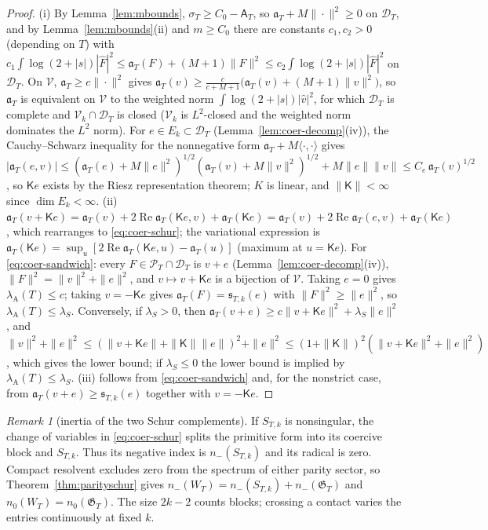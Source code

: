 \documentclass[11pt]{amsart}
\theoremstyle{definition}
\theoremstyle{remark}
\newtheorem{remark}[theorem]{Remark}
\newcommand{\Rel}{\operatorname{Re}}
\newcommand{\PT}{\mathcal P_T}
\newcommand{\lamA}{\lambda_{\mathrm A}(T)}
\newcommand{\Fh}{\widehat F}
\newcommand{\Aconst}{\mathsf A_T}
\begin{document}
\begin{proof}
(i) By Lemma~\ref{lem:mbounds}, $\sigma_T\ge C_0-\Aconst$, so $\mathfrak a_T+M\|\cdot\|^2\ge0$ on $\mathcal D_T$, and
by Lemma~\ref{lem:mbounds}(ii) and $m\ge C_0$ there are constants $c_1,c_2>0$ (depending on $T$) with
$c_1\int\log(2+|s|)|\Fh|^2\le\mathfrak a_T(F)+(M+1)\|F\|^2\le c_2\int\log(2+|s|)|\Fh|^2$ on $\mathcal D_T$. On $\mathcal V$,
$\mathfrak a_T\ge c\|\cdot\|^2$ gives $\mathfrak a_T(v)\ge\frac c{c+M+1}\big(\mathfrak a_T(v)+(M+1)\|v\|^2\big)$, so
$\mathfrak a_T$ is equivalent on $\mathcal V$ to the weighted norm $\int\log(2+|s|)|\widehat v|^2$, for which
$\mathcal D_T$ is complete and $\mathcal V_k\cap\mathcal D_T$ is closed ($\mathcal V_k$ is $L^2$-closed and the weighted norm
dominates the $L^2$ norm). For $e\in E_k\subset\mathcal D_T$ (Lemma~\ref{lem:coer-decomp}(iv)), the Cauchy--Schwarz
inequality for the nonnegative form $\mathfrak a_T+M\langle\cdot,\cdot\rangle$ gives
$|\mathfrak a_T(e,v)|\le(\mathfrak a_T(e)+M\|e\|^2)^{1/2}(\mathfrak a_T(v)+M\|v\|^2)^{1/2}+M\|e\|\|v\|\le C_e\,\mathfrak a_T(v)^{1/2}$,
so $\mathsf Ke$ exists by the Riesz representation theorem; $K$ is linear, and $\|\mathsf K\|<\infty$ since $\dim E_k<\infty$.
(ii) $\mathfrak a_T(v+\mathsf Ke)=\mathfrak a_T(v)+2\Rel\mathfrak a_T(\mathsf Ke,v)+\mathfrak a_T(\mathsf Ke)=\mathfrak a_T(v)+2\Rel\mathfrak a_T(e,v)+\mathfrak a_T(\mathsf Ke)$,
which rearranges to \eqref{eq:coer-schur}; the variational expression is $\mathfrak a_T(\mathsf Ke)=\sup_u[2\Rel\mathfrak a_T(\mathsf Ke,u)-\mathfrak a_T(u)]$
(maximum at $u=\mathsf Ke$). For \eqref{eq:coer-sandwich}: every $F\in\PT\cap\mathcal D_T$ is $v+e$ (Lemma~\ref{lem:coer-decomp}(iv)),
$\|F\|^2=\|v\|^2+\|e\|^2$, and $v\mapsto v+\mathsf Ke$ is a bijection of $\mathcal V$. Taking $e=0$ gives $\lamA\le c$; taking
$v=-\mathsf Ke$ gives $\mathfrak a_T(F)=\mathfrak s_{T,k}(e)$ with $\|F\|^2\ge\|e\|^2$, so $\lamA\le\lambda_S$. Conversely, if
$\lambda_S>0$, then $\mathfrak a_T(v+e)\ge c\|v+\mathsf Ke\|^2+\lambda_S\|e\|^2$, and
$\|v\|^2+\|e\|^2\le(\|v+\mathsf Ke\|+\|\mathsf K\|\|e\|)^2+\|e\|^2\le(1+\|\mathsf K\|)^2(\|v+\mathsf Ke\|^2+\|e\|^2)$, which gives the lower bound; if
$\lambda_S\le0$ the lower bound is implied by $\lamA\le\lambda_S$. (iii) follows from \eqref{eq:coer-sandwich}
and, for the nonstrict case, from $\mathfrak a_T(v+e)\ge\mathfrak s_{T,k}(e)$ together with $v=-\mathsf Ke$.
\end{proof}

\begin{remark}[inertia of the two Schur complements]\label{rem:inertiatower}
If $S_{T,k}$ is nonsingular, the change of variables in
\eqref{eq:coer-schur} splits the primitive form into its coercive block
and $S_{T,k}$. Thus its negative index is $n_-(S_{T,k})$ and its radical
is zero. Compact resolvent excludes zero from the spectrum of either
parity sector, so Theorem~\ref{thm:parityschur} gives
$n_-(W_T)=n_-(S_{T,k})+n_-(\mathfrak G_T)$ and
$n_0(W_T)=n_0(\mathfrak G_T)$. The size $2k-2$ counts blocks;
crossing a contact varies the entries continuously at fixed $k$.
\end{remark}
\end{document}
